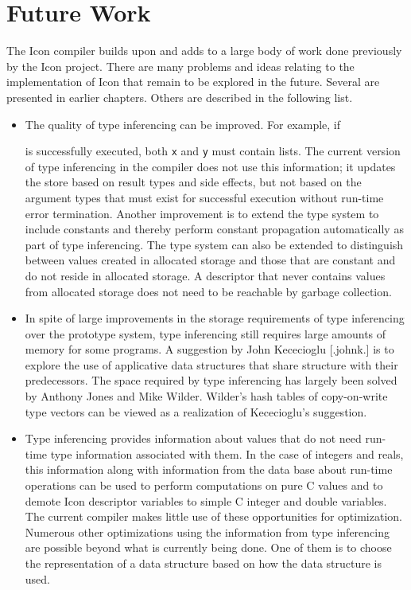 \section{Future Work}

The Icon compiler builds upon and adds to a large body of work done
previously by the Icon project. There are many problems and ideas
relating to the implementation of Icon that remain to be explored in
the future. Several are presented in earlier chapters. Others are
described in the following list.

\liststyleLxxxv
\begin{itemize}
\item 
The quality of type inferencing can be improved. For example, if 


\noindent
is successfully executed, both \texttt{x} and \texttt{y} must contain
lists. The current version of type inferencing in the compiler does
not use this information; it updates the store based on result types
and side effects, but not based on the argument types that must exist
for successful execution without run-time error termination. Another
improvement is to extend the type system to include constants and
thereby perform constant propagation automatically as part of type
inferencing.  The type system can also be extended to distinguish
between values created in allocated storage and those that are
constant and do not reside in allocated storage. A descriptor that
never contains values from allocated storage does not need to be
reachable by garbage collection.

\item In spite of large improvements in the storage requirements of
type inferencing over the prototype system, type inferencing still requires
large amounts of memory for some programs. A suggestion by John
Kececioglu [.johnk.] is to explore the use of applicative data
structures that share structure with their predecessors. The space
required by type inferencing has largely been solved by Anthony Jones
and Mike Wilder. Wilder's hash tables of copy-on-write type vectors
can be viewed as a realization of Kececioglu's suggestion.

\item Type inferencing provides information about values that do not
need run-time type information associated with them. In the case of
integers and reals, this information along with information from the
data base about run-time operations can be used to perform
computations on pure C values and to demote Icon descriptor variables
to simple C integer and double variables. The current compiler makes
little use of these opportunities for optimization. Numerous other
optimizations using the information from type inferencing are possible
beyond what is currently being done. One of them is to choose the
representation of a data structure based on how the data structure is used.


\end{itemize}
